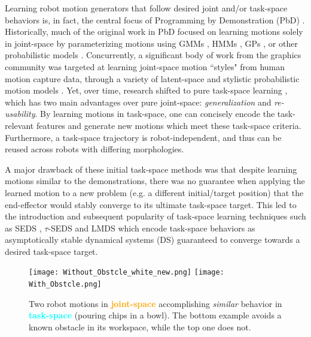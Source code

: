 \documentclass[letterpaper, 10 pt, conference,fleqn]{ieeeconf}
\begin{document}
Learning robot motion generators that follow desired joint and/or task-space behaviors is, in fact, the central focus of Programming by Demonstration (PbD) \cite{billard2008robot} \cite{Argall:RAS:2009}. Historically, much of the original work in PbD focused on learning motions solely in joint-space by parameterizing motions using GMMs \cite{Calinon:HRI:2007}, HMMs \cite{Garrido:Neuro:2015}, GPs \cite{Shon:HUM:2005}, or other probabilistic models \cite{Schaal:IROS:2003,Schaal:AI:2002}. Concurrently, a significant body of work from the graphics community was targeted at learning joint-space motion ``styles" from human motion capture data, through a variety of latent-space and stylistic probabilistic motion models \cite{gielniak2010stylized,grochow2004style}. Yet, over time, research shifted to pure task-space learning \cite{Pastor:ICRA:2009,Gribovskaya:IJRR:2011,Calinon:ISR:2015}, which has two main advantages over pure joint-space: \textit{generalization} and \textit{re-usability}. By learning motions in task-space, one can concisely encode the task-relevant features and generate new motions which meet these task-space criteria. Furthermore, a task-space trajectory is robot-independent, and thus can be reused across robots with differing morphologies.

A major drawback of these initial task-space methods was that despite learning motions similar to the demonstrations, there was no guarantee when applying the learned motion to a new problem (e.g. a different initial/target position) that the end-effector would stably converge to its ultimate task-space target. This led to the introduction and subsequent popularity of task-space learning techniques such as SEDS \cite{khansari2011learning}, $\tau$-SEDS \cite{Neumann:RAS:2015}  and LMDS \cite{Kronander:RAS:2015} which encode task-space behaviors as asymptotically stable dynamical systems (DS) guaranteed to converge towards a desired task-space target.

\begin{figure}[t]
\centering
\texttt{[image: Without\_Obstcle\_white\_new.png]}
\texttt{[image: With\_Obstcle.png]}
\caption{Two robot motions in \textcolor{orange}{\textbf{joint-space}} accomplishing \textit{similar} behavior in \textcolor{cyan}{\textbf{task-space}} (pouring chips in a bowl). The bottom example avoids a known obstacle in its workspace, while the top one does not.}
\label{fig:robot_example}
\end{figure}
\end{document}
